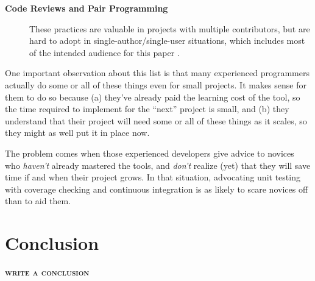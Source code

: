 \documentclass[10pt]{article}
\newcommand{\fixme}[1]{\textsc{\textbf{#1}}}
\begin{document}
\begin{description}
\item[\textbf{Code Reviews and Pair Programming}]
  These practices are valuable in projects with multiple contributors,
  but are hard to adopt in single-author/single-user situations, which
  includes most of the intended audience for this paper \cite{petre2014}.

\end{description}

One important observation about this list is that many experienced
programmers actually do some or all of these things even for small
projects. It makes sense for them to do so because (a) they've already
paid the learning cost of the tool, so the time required to implement
for the ``next'' project is small, and (b) they understand that their
project will need some or all of these things as it scales, so they
might as well put it in place now.

The problem comes when those experienced developers give advice to
novices who \emph{haven't} already mastered the tools, and \emph{don't}
realize (yet) that they will save time if and when their project grows.
In that situation, advocating unit testing with coverage checking and
continuous integration is as likely to scare novices off than to aid
them.

\section{Conclusion}\label{sec:conclusion}

\fixme{write a conclusion}


\end{document}
